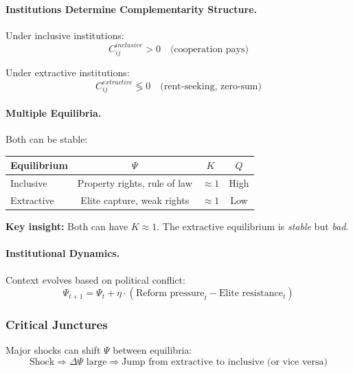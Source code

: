 \paragraph{Institutions Determine Complementarity Structure.}
Under inclusive institutions:
\begin{equation}
  C_{ij}^{inclusive} > 0 \quad \text{(cooperation pays)}
\end{equation}

Under extractive institutions:
\begin{equation}
  C_{ij}^{extractive} \lessgtr 0 \quad \text{(rent-seeking, zero-sum)}
\end{equation}

\paragraph{Multiple Equilibria.}
Both can be stable:
\begin{center}
\renewcommand{\arraystretch}{1.2}
\begin{tabular}{lccc}
\hline
\textbf{Equilibrium} & $\Psi$ & $K$ & $Q$ \\
\hline
Inclusive & Property rights, rule of law & $\approx 1$ & High \\
Extractive & Elite capture, weak rights & $\approx 1$ & Low \\
\hline
\end{tabular}
\end{center}

\textbf{Key insight:} Both can have $K \approx 1$.
The extractive equilibrium is \emph{stable} but \emph{bad}.

\paragraph{Institutional Dynamics.}
Context evolves based on political conflict:
\begin{equation}
  \Psi_{t+1} = \Psi_t + \eta \cdot (\text{Reform pressure}_t - \text{Elite resistance}_t)
\end{equation}

\subsubsection{Critical Junctures}

Major shocks can shift $\Psi$ between equilibria:
\begin{equation}
  \text{Shock} \Rightarrow \Delta \Psi \text{ large} \Rightarrow 
  \text{Jump from extractive to inclusive (or vice versa)}
\end{equation}

